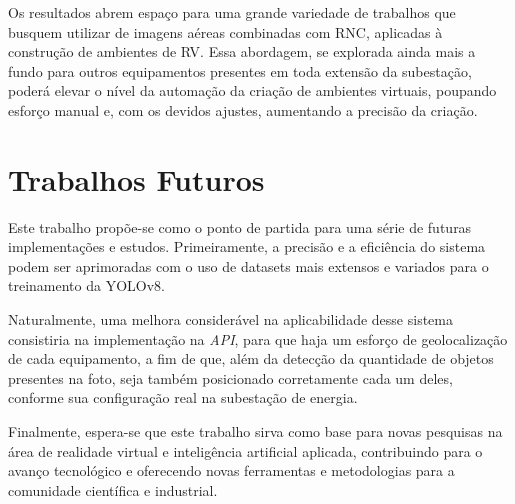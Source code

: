 Os resultados abrem espaço para uma grande variedade de trabalhos que busquem utilizar de imagens aéreas combinadas com RNC, aplicadas à construção de ambientes de RV. Essa abordagem, se explorada ainda mais a fundo para outros equipamentos presentes em toda extensão da subestação, poderá elevar o nível da automação da criação de ambientes virtuais, poupando esforço manual e, com os devidos ajustes, aumentando a precisão da criação.

\section{Trabalhos Futuros} 

Este trabalho propõe-se como o ponto de partida para uma série de futuras implementações e estudos. Primeiramente, a precisão e a eficiência do sistema podem ser aprimoradas com o uso de datasets mais extensos e variados para o treinamento da YOLOv8. 

Naturalmente, uma melhora considerável na aplicabilidade desse sistema consistiria na implementação na \textit{API}, para que haja um esforço de geolocalização de cada equipamento, a fim de que, além da detecção da quantidade de objetos presentes na foto, seja também posicionado corretamente cada um deles, conforme sua configuração real na subestação de energia. 

Finalmente, espera-se que este trabalho sirva como base para novas pesquisas na área de realidade virtual e inteligência artificial aplicada, contribuindo para o avanço tecnológico e oferecendo novas ferramentas e metodologias para a comunidade científica e industrial.


